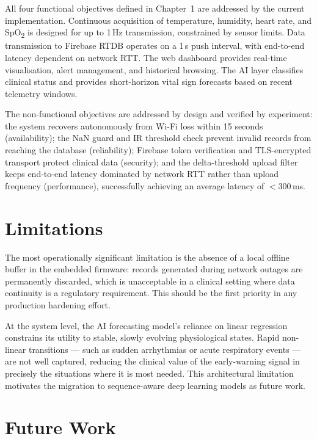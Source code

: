 All four functional objectives defined in Chapter~1 are addressed by the current
implementation. Continuous acquisition of temperature, humidity, heart rate, and
SpO\textsubscript{2} is designed for up to 1\,Hz transmission, constrained by sensor
limits. Data transmission to Firebase\cite{firebase_rtdb} RTDB operates on a 1\,s push interval, with
end-to-end latency dependent on network RTT. The web dashboard provides real-time
visualisation, alert management, and historical browsing. The AI layer classifies
clinical status and provides short-horizon vital sign forecasts based on recent
telemetry windows.

The non-functional objectives are addressed by design and verified by experiment: the system recovers
autonomously from Wi-Fi loss within 15 seconds (availability); the
NaN guard and IR threshold check prevent invalid records from reaching the
database (reliability); Firebase token verification and TLS-encrypted transport
protect clinical data (security); and the delta-threshold upload filter keeps
end-to-end latency dominated by network RTT rather than upload frequency
(performance), successfully achieving an average latency of $<300$\,ms.

\section{Limitations}

The most operationally significant limitation is the absence of a local offline
buffer in the embedded firmware: records generated during network outages are
permanently discarded, which is unacceptable in a clinical setting where data
continuity is a regulatory requirement. This should be the first priority in
any production hardening effort.

At the system level, the AI forecasting model's reliance on linear regression
constrains its utility to stable, slowly evolving physiological states. Rapid
non-linear transitions — such as sudden arrhythmias or acute respiratory events
— are not well captured, reducing the clinical value of the early-warning signal
in precisely the situations where it is most needed. This architectural limitation
motivates the migration to sequence-aware deep learning models as future work.

\section{Future Work}

